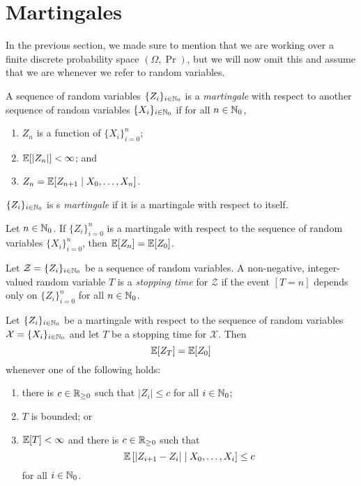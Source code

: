 \section{Martingales}

In the previous section, we made sure to mention that we are working over a finite discrete probability space $(\Omega, \Pr)$, but we will now omit this and assume that we are whenever we refer to random variables.

\begin{definition}[Martingale]
    A sequence of random variables $\{Z_i\}_{i \in \mathbb N_0}$ is a \emph{martingale} with respect to another sequence of random variables $\{X_i\}_{i \in \mathbb N_0}$ if for all $n \in \mathbb N_0$,
    \begin{enumerate}
        \item $Z_n$ is a function of $\{X_i\}_{i=0}^n$;
        \item $\mathbb E[\lvert Z_n \rvert] < \infty$; and
        \item $Z_n = \mathbb E[Z_{n+1} \mid X_0, \ldots, X_n]$. 
    \end{enumerate}
    $\{Z_i\}_{i \in \mathbb N_0}$ is s \emph{martingale} if it is a martingale with respect to itself. 
\end{definition}

\begin{lemma}
    Let $n \in \mathbb N_0$. If $\{Z_i\}_{i = 0}^n$ is a martingale with respect to the sequence of random variables $\{X_i\}_{i=0}^n$, then $\mathbb E[Z_n] = \mathbb E[Z_0]$.
\end{lemma}

\begin{definition}
    Let $\mathcal Z = \{Z_i\}_{i \in \mathbb N_0}$ be a sequence of random variables. A non-negative, integer-valued random variable $T$ is a \emph{stopping time} for $\mathcal Z$ if the event $[T = n]$ depends only on $\{Z_i\}_{i=0}^{n}$ for all $n \in \mathbb N_0$. 
\end{definition}

\begin{theorem}
    Let $\{Z_i\}_{i \in \mathbb N_0}$ be a martingale with respect to the sequence of random variables $\mathcal X = \{X_i\}_{i \in \mathbb N_0}$ and let $T$ be a stopping time for $\mathcal X$. Then
    \[ \mathbb E[Z_T] = \mathbb E[Z_0] \]
    whenever one of the following holds:
    \begin{enumerate}
        \item there is $c \in \mathbb R_{\geq 0}$ such that $\lvert Z_i \rvert \leq c$ for all $i \in \mathbb N_0$;
        \item $T$ is bounded; or
        \item $\mathbb E[T] < \infty$ and there is $c \in \mathbb R_{\geq 0}$ such that 
        \[\mathbb E\left[\lvert Z_{i+1} - Z_i\rvert \mid X_0, \ldots, X_i\right] \leq c\] 
        for all $i \in \mathbb N_0$. 
    \end{enumerate}
\end{theorem}

